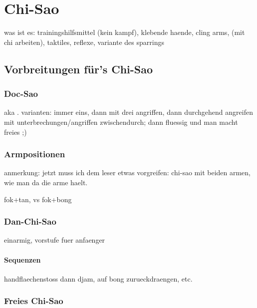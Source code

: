 

\renewcommand\chapterillustration{pushing_minimalistisch}
\chapter{Chi-Sao}

was ist es: trainingshilfsmittel (kein kampf), klebende haende, cling arms, (mit chi arbeiten), taktiles, reflexe, variante des sparrings


\section{Vorbreitungen f\"ur's Chi-Sao}

\subsection{Doc-Sao}

aka . varianten: immer eins, dann mit drei angriffen, dann durchgehend angreifen mit unterbrechungen/angriffen zwischendurch; dann fluessig und man macht freies ;)

\subsection{Armpositionen}

anmerkung: jetzt muss ich dem leser etwas vorgreifen: chi-sao mit beiden armen, wie man da die arme haelt.

fok+tan, vs fok+bong

\subsection{Dan-Chi-Sao}

einarmig, vorstufe fuer anfaenger

\subsubsection{Sequenzen}

handflaechenstoss dann djam, auf bong zurueckdraengen, etc.

\subsection{Freies Chi-Sao}

